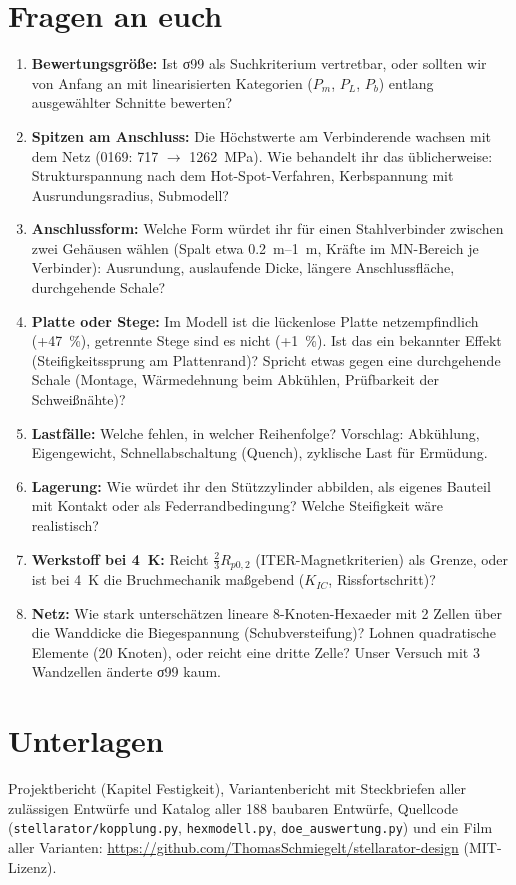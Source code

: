\documentclass[10pt,a4paper]{article}
\begin{document}
\section{Fragen an euch}\label{sec:fragen}
\begin{enumerate}[itemsep=3pt]
\item \textbf{Bewertungsgröße:} Ist σ99 als Suchkriterium vertretbar, oder sollten wir von Anfang an mit
linearisierten Kategorien ($P_m$, $P_L$, $P_b$) entlang ausgewählter Schnitte bewerten?
\item \textbf{Spitzen am Anschluss:} Die Höchstwerte am Verbinderende wachsen mit dem Netz (0169: \SI{717}{} $\to$
\SI{1262}{MPa}). Wie behandelt ihr das üblicherweise: Strukturspannung nach dem Hot-Spot-Verfahren, Kerbspannung mit
Ausrundungsradius, Submodell?
\item \textbf{Anschlussform:} Welche Form würdet ihr für einen Stahlverbinder zwischen zwei Gehäusen wählen (Spalt
etwa \SIrange{0,2}{1}{m}, Kräfte im MN-Bereich je Verbinder): Ausrundung, auslaufende Dicke, längere
Anschlussfläche, durchgehende Schale?
\item \textbf{Platte oder Stege:} Im Modell ist die lückenlose Platte netzempfindlich (+47~\%), getrennte Stege sind
es nicht (+1~\%). Ist das ein bekannter Effekt (Steifigkeitssprung am Plattenrand)? Spricht etwas gegen eine
durchgehende Schale (Montage, Wärmedehnung beim Abkühlen, Prüfbarkeit der Schweißnähte)?
\item \textbf{Lastfälle:} Welche fehlen, in welcher Reihenfolge? Vorschlag: Abkühlung, Eigengewicht,
Schnellabschaltung (Quench), zyklische Last für Ermüdung.
\item \textbf{Lagerung:} Wie würdet ihr den Stützzylinder abbilden, als eigenes Bauteil mit Kontakt oder als
Federrandbedingung? Welche Steifigkeit wäre realistisch?
\item \textbf{Werkstoff bei 4~K:} Reicht $\tfrac23R_{p0,2}$ (ITER-Magnetkriterien) als Grenze, oder ist bei \SI{4}{K}
die Bruchmechanik maßgebend ($K_{IC}$, Rissfortschritt)?
\item \textbf{Netz:} Wie stark unterschätzen lineare 8-Knoten-Hexaeder mit 2 Zellen über die Wanddicke die
Biegespannung (Schubversteifung)? Lohnen quadratische Elemente (20 Knoten), oder reicht eine dritte Zelle? Unser
Versuch mit 3 Wandzellen änderte σ99 kaum.
\end{enumerate}

\section*{Unterlagen}
Projektbericht (Kapitel Festigkeit), Variantenbericht mit Steckbriefen aller zulässigen Entwürfe und Katalog aller
188 baubaren Entwürfe, Quellcode (\texttt{stellarator/kopplung.py}, \texttt{hexmodell.py}, \texttt{doe\_auswertung.py})
und ein Film aller Varianten: \url{https://github.com/ThomasSchmiegelt/stellarator-design} (MIT-Lizenz).
\end{document}
